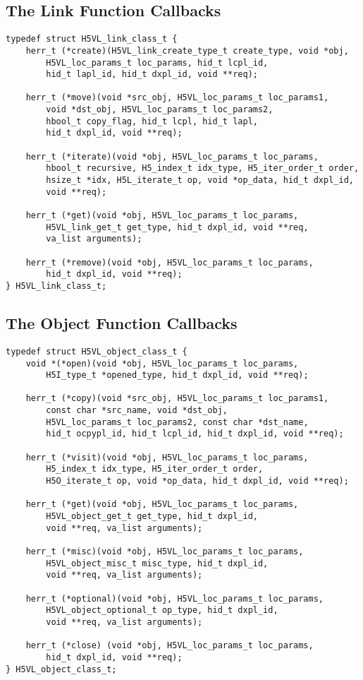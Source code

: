 \documentclass[10pt,a4paper]{article}
\begin{document}
\subsection{The Link Function Callbacks}
\begin{lstlisting}
typedef struct H5VL_link_class_t {
    herr_t (*create)(H5VL_link_create_type_t create_type, void *obj,
        H5VL_loc_params_t loc_params, hid_t lcpl_id, 
        hid_t lapl_id, hid_t dxpl_id, void **req);

    herr_t (*move)(void *src_obj, H5VL_loc_params_t loc_params1,
        void *dst_obj, H5VL_loc_params_t loc_params2,
        hbool_t copy_flag, hid_t lcpl, hid_t lapl, 
        hid_t dxpl_id, void **req);

    herr_t (*iterate)(void *obj, H5VL_loc_params_t loc_params, 
        hbool_t recursive, H5_index_t idx_type, H5_iter_order_t order, 
        hsize_t *idx, H5L_iterate_t op, void *op_data, hid_t dxpl_id, 
        void **req);

    herr_t (*get)(void *obj, H5VL_loc_params_t loc_params, 
        H5VL_link_get_t get_type, hid_t dxpl_id, void **req, 
        va_list arguments);

    herr_t (*remove)(void *obj, H5VL_loc_params_t loc_params, 
        hid_t dxpl_id, void **req);
} H5VL_link_class_t;
\end{lstlisting}

\subsection{The Object Function Callbacks}

\begin{lstlisting}
typedef struct H5VL_object_class_t {
    void *(*open)(void *obj, H5VL_loc_params_t loc_params, 
        H5I_type_t *opened_type, hid_t dxpl_id, void **req);

    herr_t (*copy)(void *src_obj, H5VL_loc_params_t loc_params1, 
        const char *src_name, void *dst_obj, 
        H5VL_loc_params_t loc_params2, const char *dst_name,
        hid_t ocpypl_id, hid_t lcpl_id, hid_t dxpl_id, void **req);

    herr_t (*visit)(void *obj, H5VL_loc_params_t loc_params, 
        H5_index_t idx_type, H5_iter_order_t order, 
        H5O_iterate_t op, void *op_data, hid_t dxpl_id, void **req);

    herr_t (*get)(void *obj, H5VL_loc_params_t loc_params, 
        H5VL_object_get_t get_type, hid_t dxpl_id, 
        void **req, va_list arguments);

    herr_t (*misc)(void *obj, H5VL_loc_params_t loc_params, 
        H5VL_object_misc_t misc_type, hid_t dxpl_id, 
        void **req, va_list arguments);

    herr_t (*optional)(void *obj, H5VL_loc_params_t loc_params, 
        H5VL_object_optional_t op_type, hid_t dxpl_id, 
        void **req, va_list arguments);

    herr_t (*close) (void *obj, H5VL_loc_params_t loc_params, 
        hid_t dxpl_id, void **req);
} H5VL_object_class_t;
\end{lstlisting}
\end{document}
